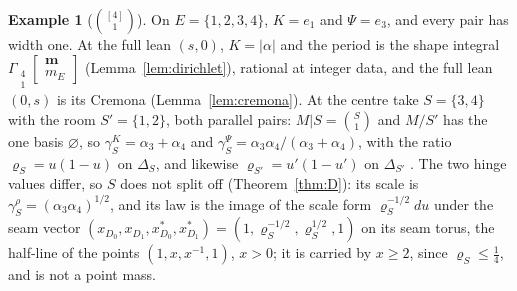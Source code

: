 \documentclass[11pt]{article}
\theoremstyle{plain}
\theoremstyle{definition}
\newtheorem{example}[prop]{Example}
\theoremstyle{remark}
\newcommand{\bm}{\mathbf m}
\newcommand{\Gst}[4]{\Gamma_{\substack{#1\\#2}}\!\begin{bmatrix}#3\\#4\end{bmatrix}}
\begin{document}
\begin{example}[$\binom{[4]}1$]\label{ex:U14}
On $E=\{1,2,3,4\}$, $K=e_1$ and $\Psi=e_3$, and every pair has width one. At the full lean $(s,0)$, $K=|\alpha|$ and the period is the shape integral $\Gst41{\bm}{m_E}$ (Lemma~\ref{lem:dirichlet}), rational at integer data, and the full lean $(0,s)$ is its Cremona (Lemma~\ref{lem:cremona}). At the centre take $S=\{3,4\}$ with the room $S'=\{1,2\}$, both parallel pairs: $M|S=\binom S1$ and $M/S'$ has the one basis $\varnothing$, so $\gamma^K_S=\alpha_3+\alpha_4$ and $\gamma^\Psi_S=\alpha_3\alpha_4/(\alpha_3+\alpha_4)$, with the ratio $\varrho_S=u(1-u)$ on $\Delta_S$, and likewise $\varrho_{S'}=u'(1-u')$ on $\Delta_{S'}$ \cite[Prop.~18.5, p.~116]{F}. The two hinge values differ, so $S$ does not split off (Theorem~\ref{thm:D}): its scale is $\gamma^\rho_S=(\alpha_3\alpha_4)^{1/2}$, and its law is the image of the scale form $\varrho_S^{-1/2}du$ under the seam vector $(x_{D_0},x_{D_1},x^\ast_{D_0},x^\ast_{D_1})=(1,\varrho_S^{-1/2},\varrho_S^{1/2},1)$ on its seam torus, the half-line of the points $(1,x,x^{-1},1)$, $x>0$; it is carried by $x\ge2$, since $\varrho_S\le\frac14$, and is not a point mass.


\end{example}
\end{document}
